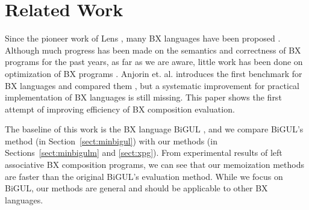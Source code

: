 \section{Related Work} \label{sect:related}


Since the pioneer work of Lens \cite{Foster:2007:CBT:1232420.1232424}, many BX languages have been proposed \cite{Bohannon06relationallenses:, Bohannon:2008:BRL:1328438.1328487,Buchmann:2018:BFI:3362232.3362263,Ko:2016:BFV:2847538.2847544,LeblebiciAS14,Samimi-Dehkordi18,Cicchetti2011,Hinkel:2019:CPB:3318595.3318634}.
Although much progress has been made on the semantics and correctness of BX programs for the past years, as far as we are aware, little work has been done on optimization of BX programs \cite{Horn:2018:IRL:3243631.3236769}. Anjorin et. al. introduces the first benchmark for BX languages and compared them \cite{Anjorin2019}, but a systematic improvement for practical implementation of BX languages is still missing. This paper shows the first attempt of improving efficiency of BX composition evaluation.

The baseline of this work is the BX language BiGUL \cite{Ko:2016:BFV:2847538.2847544, Ko:2017:ABB:3177123.3158129}, and we compare BiGUL's method (in Section~\ref{sect:minbigul}) with our methods (in Sections~\ref{sect:minbigulm} and \ref{sect:xpg}). From experimental results of left associative BX composition programs, we can see that our memoization methods are faster than the original BiGUL's evaluation method.
While we focus on BiGUL, our methods are general and should be applicable to other BX languages.



